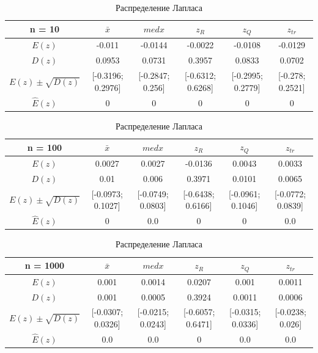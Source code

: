 \documentclass[12pt]{article}
\begin{document}
\begin{center}
\begin{table}[ht]
\end{table}

\begin{table}
\caption{Распределение Лапласа}
\begin{adjustbox}{width=\textwidth}
\begin{tabular}{| c | c | c | c | c | c |}
\hline
n = 10 & $\bar{x}$ & $med x$ & $z_R$ & $z_Q$ & $z_{tr}$ \\\hline
$E(z)$ & -0.011 & -0.0144 & -0.0022 & -0.0108 & -0.0129 \\\hline
$D(z)$ & 0.0953 & 0.0731 & 0.3957 & 0.0833 & 0.0702 \\\hline
$E(z) \pm \sqrt{D(z)}$ & [-0.3196; 0.2976] & [-0.2847; 0.256] & [-0.6312; 0.6268] & [-0.2995; 0.2779] & [-0.278; 0.2521]\\\hline
$\hat{E}(z)$ & 0 & 0 & 0 & 0 & 0 \\\hline
\end{tabular}
\end{adjustbox}

\begin{adjustbox}{width=\textwidth}
\begin{tabular}{| c | c | c | c | c | c |}
\hline
n = 100 & $\bar{x}$ & $med x$ & $z_R$ & $z_Q$ & $z_{tr}$ \\\hline
$E(z)$ & 0.0027 & 0.0027 & -0.0136 & 0.0043 & 0.0033 \\\hline
$D(z)$ & 0.01 & 0.006 & 0.3971 & 0.0101 & 0.0065 \\\hline
$E(z) \pm \sqrt{D(z)}$ & [-0.0973; 0.1027] & [-0.0749; 0.0803] & [-0.6438; 0.6166] & [-0.0961; 0.1046] & [-0.0772; 0.0839]\\\hline
$\hat{E}(z)$ & 0 & 0.0 & 0 & 0 & 0.0 \\\hline
\end{tabular}
\end{adjustbox}

\begin{adjustbox}{width=\textwidth}
\begin{tabular}{| c | c | c | c | c | c |}
\hline
n = 1000 & $\bar{x}$ & $med x$ & $z_R$ & $z_Q$ & $z_{tr}$ \\\hline
$E(z)$ & 0.001 & 0.0014 & 0.0207 & 0.001 & 0.0011 \\\hline
$D(z)$ & 0.001 & 0.0005 & 0.3924 & 0.0011 & 0.0006 \\\hline
$E(z) \pm \sqrt{D(z)}$ & [-0.0307; 0.0326] & [-0.0215; 0.0243] & [-0.6057; 0.6471] & [-0.0315; 0.0336] & [-0.0238; 0.026]\\\hline
$\hat{E}(z)$ & 0.0 & 0.0 & 0 & 0.0 & 0.0 \\\hline
\end{tabular}
\end{adjustbox}


\end{table}
\end{center}
\end{document}
